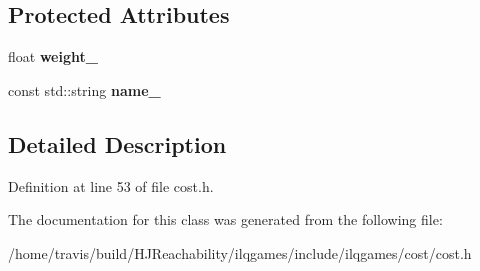 \subsection*{Protected Attributes}
\begin{DoxyCompactItemize}
\item 
float {\bfseries weight\+\_\+}\hypertarget{classilqgames_1_1_cost_a03c98f733c0e722960dad9e80e235652}{}\label{classilqgames_1_1_cost_a03c98f733c0e722960dad9e80e235652}

\item 
const std\+::string {\bfseries name\+\_\+}\hypertarget{classilqgames_1_1_cost_a36d7d9ee9585912fc98fca10d9c81614}{}\label{classilqgames_1_1_cost_a36d7d9ee9585912fc98fca10d9c81614}

\end{DoxyCompactItemize}


\subsection{Detailed Description}


Definition at line 53 of file cost.\+h.



The documentation for this class was generated from the following file\+:\begin{DoxyCompactItemize}
\item 
/home/travis/build/\+H\+J\+Reachability/ilqgames/include/ilqgames/cost/cost.\+h\end{DoxyCompactItemize}
